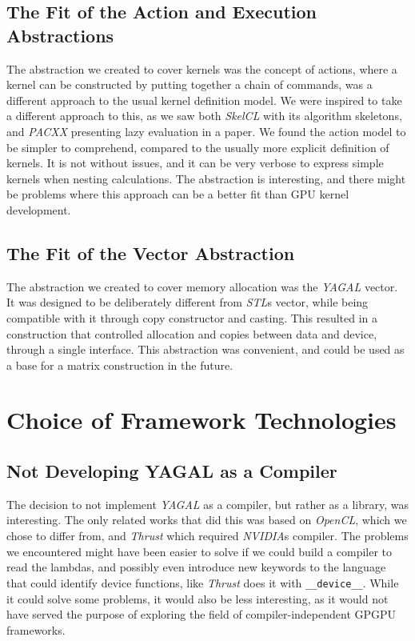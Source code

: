 \subsection*{The Fit of the Action and Execution Abstractions}
The abstraction we created to cover kernels was the concept of actions, where a kernel can be constructed by putting together a chain of commands, was a different approach to the usual kernel definition model. We were inspired to take a different approach to this, as we saw both \textit{SkelCL} with its algorithm skeletons, and \textit{PACXX} presenting lazy evaluation in a paper\cite{lazyPacxx}. We found the action model to be simpler to comprehend, compared to the usually more explicit definition of kernels. It is not without issues, and it can be very verbose to express simple kernels when nesting calculations. The abstraction is interesting, and there might be problems where this approach can be a better fit than GPU kernel development.

\subsection*{The Fit of the Vector Abstraction}
The abstraction we created to cover memory allocation was the \textit{YAGAL} vector. It was designed to be deliberately different from \textit{STL}s vector, while being compatible with it through copy constructor and casting. This resulted in a construction that controlled allocation and copies between data and device, through a single interface. This abstraction was convenient, and could be used as a base for a matrix construction in the future.

\section*{Choice of Framework Technologies}
\subsection*{Not Developing YAGAL as a Compiler}
The decision to not implement \textit{YAGAL} as a compiler, but rather as a library, was interesting. The only related works that did this was based on \textit{OpenCL}, which we chose to differ from, and \textit{Thrust} which required \textit{NVIDIA}s compiler. The problems we encountered might have been easier to solve if we could build a compiler to read the lambdas, and possibly even introduce new keywords to the language that could identify device functions, like \textit{Thrust} does it with \texttt{\_\_device\_\_}. While it could solve some problems, it would also be less interesting, as it would not have served the purpose of exploring the field of compiler-independent GPGPU frameworks.  

